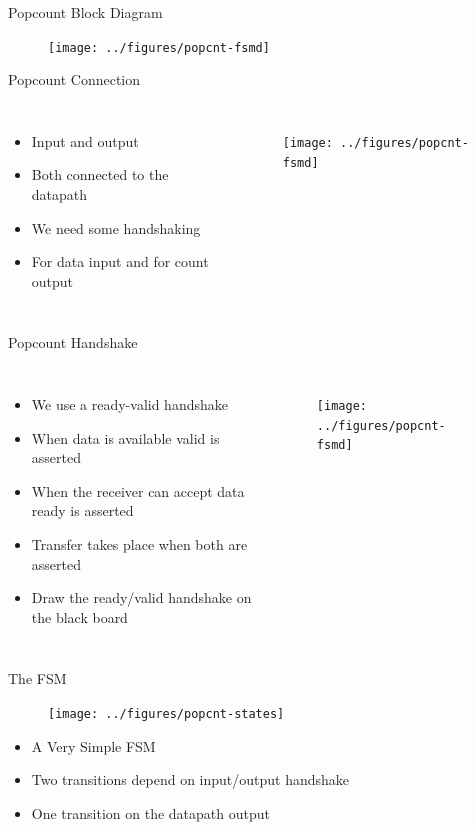 \begin{frame}[fragile]{Popcount Block Diagram}

\begin{figure}
  \texttt{[image: ../figures/popcnt-fsmd]}
\end{figure}
\end{frame}


\begin{frame}[fragile]{Popcount Connection}
\begin{columns}
\begin{itemize}
\item Input  and output 
\item Both connected to the datapath
\item We need some handshaking
\item For data input and for count output
\end{itemize}
\begin{figure}
  \texttt{[image: ../figures/popcnt-fsmd]}
\end{figure}
\end{columns}
\end{frame}

\begin{frame}[fragile]{Popcount Handshake}
\begin{columns}
\begin{itemize}
\item We use a ready-valid handshake
\item When data is available valid is asserted
\item When the receiver can accept data ready is asserted
\item Transfer takes place when both are asserted
\item Draw the ready/valid handshake on the black board
\end{itemize}
\begin{figure}
  \texttt{[image: ../figures/popcnt-fsmd]}
\end{figure}
\end{columns}
\end{frame}


\begin{frame}[fragile]{The FSM}
\begin{figure}
  \texttt{[image: ../figures/popcnt-states]}
\end{figure}
\begin{itemize}
\item A Very Simple FSM
\item Two transitions depend on input/output handshake
\item One transition on the datapath output
\end{itemize}
\end{frame}

